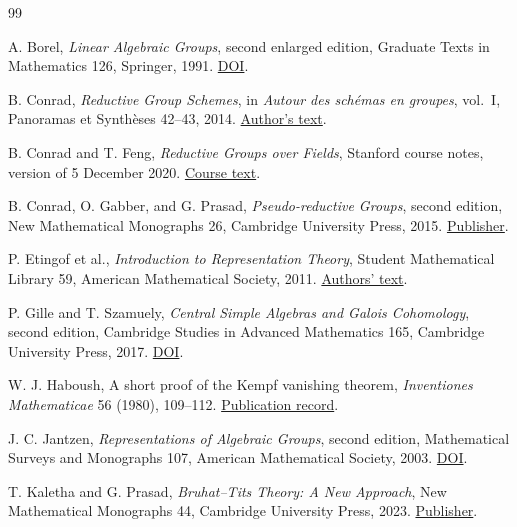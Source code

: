 \documentclass[11pt,a4paper,openany,oneside]{book}
\theoremstyle{resultstyle}
\theoremstyle{definition}
\numberwithin{equation}{chapter}
\begin{document}
\backmatter
{\small\begin{thebibliography}{99}

A. Borel, \emph{Linear Algebraic Groups}, second enlarged edition,
Graduate Texts in Mathematics 126, Springer, 1991.
\href{https://doi.org/10.1007/978-1-4612-0941-6}{DOI}.

B. Conrad, \emph{Reductive Group Schemes}, in \emph{Autour des schémas en groupes}, vol.~I,
Panoramas et Synthèses 42--43, 2014.
\href{https://math.stanford.edu/~conrad/papers/luminysga3.pdf}{Author's text}.

B. Conrad and T. Feng, \emph{Reductive Groups over Fields},
Stanford course notes, version of 5 December 2020.
\href{https://math.stanford.edu/~conrad/249BW16Page/handouts/AMSalggroups2.pdf}{Course text}.

B. Conrad, O. Gabber, and G. Prasad, \emph{Pseudo-reductive Groups},
second edition, New Mathematical Monographs 26, Cambridge University Press, 2015.
\href{https://www.cambridge.org/core/books/pseudoreductive-groups/CA287151E422CA75682AE7A460008504}{Publisher}.

P. Etingof et al., \emph{Introduction to Representation Theory},
Student Mathematical Library 59, American Mathematical Society, 2011.
\href{https://arxiv.org/abs/0901.0827}{Authors' text}.

P. Gille and T. Szamuely, \emph{Central Simple Algebras and Galois Cohomology},
second edition, Cambridge Studies in Advanced Mathematics 165,
Cambridge University Press, 2017. \href{https://doi.org/10.1017/9781316661277}{DOI}.

W. J. Haboush, A short proof of the Kempf vanishing theorem,
\emph{Inventiones Mathematicae} 56 (1980), 109--112.
\href{https://experts.illinois.edu/en/publications/a-short-proof-of-the-kempf-vanishing-theorem}{Publication record}.

J. C. Jantzen, \emph{Representations of Algebraic Groups}, second edition,
Mathematical Surveys and Monographs 107, American Mathematical Society, 2003.
\href{https://doi.org/10.1090/surv/107}{DOI}.

T. Kaletha and G. Prasad, \emph{Bruhat--Tits Theory: A New Approach},
New Mathematical Monographs 44, Cambridge University Press, 2023.
\href{https://www.cambridge.org/core/books/bruhattits-theory/C4FFE5CC52F0DE23D68CC818146771FC}{Publisher}.


\end{thebibliography}}
\end{document}
